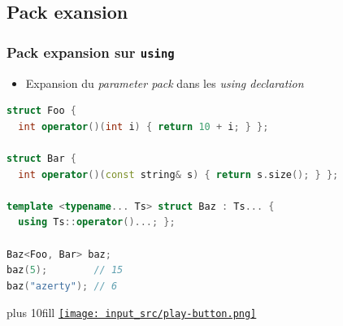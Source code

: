 \documentclass[C++.tex]{subfiles}
\begin{document}
\subsection*{Pack exansion}
\begin{frame}[fragile]
	\frametitle{Pack expansion sur \lstinline|using|}
	\begin{itemize}
		\item Expansion du \textit{parameter pack} dans les \textit{using declaration}
	\end{itemize}

	\begin{lstlisting}[language=C++]
struct Foo {
  int operator()(int i) { return 10 + i; } };

struct Bar {
  int operator()(const string& s) { return s.size(); } };

template <typename... Ts> struct Baz : Ts... {
  using Ts::operator()...; };

Baz<Foo, Bar> baz;
baz(5);        // 15
baz("azerty"); // 6\end{lstlisting}

	\vskip 10mm plus 10fill
	\hfill
	\href{https://godbolt.org/#g:!((g:!((g:!((h:codeEditor,i:(filename:'1',fontScale:14,fontUsePx:'0',j:1,lang:c%2B%2B,selection:(endColumn:1,endLineNumber:32,positionColumn:1,positionLineNumber:32,selectionStartColumn:1,selectionStartLineNumber:32,startColumn:1,startLineNumber:32),source:'%23include+%3Ciostream%3E%0A%23include+%3Cstring%3E%0A%0Astruct+Foo%0A%7B%0A++int+operator()(int+i)%0A++%7B%0A++++return+10+%2B+i%3B%0A++%7D%0A%7D%3B%0A%0Astruct+Bar%0A%7B%0A++int+operator()(const+std::string%26+s)%0A++%7B%0A++++return+s.size()%3B%0A++%7D%0A%7D%3B%0A%0Atemplate+%3Ctypename...+Ts%3E%0Astruct+Baz+:+Ts...%0A%7B%0A++using+Ts::operator()...%3B%0A%7D%3B%0A%0Aint+main()%0A%7B%0A++Baz%3CFoo,+Bar%3E+baz%3B%0A++std::cout+%3C%3C+baz(5)+%3C%3C+!'%5Cn!'%3B%0A++std::cout+%3C%3C+baz(%22azerty%22)+%3C%3C+!'%5Cn!'%3B%0A%7D%0A'),l:'5',n:'0',o:'C%2B%2B+source+%231',t:'0')),k:50,l:'4',n:'0',o:'',s:0,t:'0'),(g:!((h:executor,i:(argsPanelShown:'1',compilationPanelShown:'0',compiler:g112,compilerOutShown:'0',execArgs:'',execStdin:'',fontScale:14,fontUsePx:'0',j:1,lang:c%2B%2B,libs:!((name:boost,ver:'175')),options:'-std%3Dc%2B%2B17',source:1,stdinPanelShown:'1',tree:'1',wrap:'0'),l:'5',n:'0',o:'Executor+x86-64+gcc+11.2+(C%2B%2B,+Editor+%231)',t:'0')),header:(),k:50,l:'4',n:'0',o:'',s:0,t:'0')),l:'2',n:'0',o:'',t:'0')),version:4}{\texttt{[image: input\_src/play-button.png]}}
\end{frame}
\end{document}
